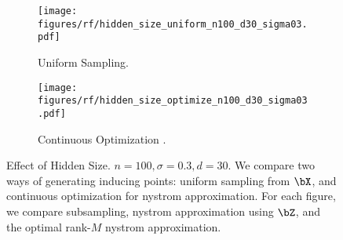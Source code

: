 \begin{figure}[h]
\centering
\begin{subfigure}[b]{\textwidth}
       \texttt{[image: figures/rf/hidden\_size\_uniform\_n100\_d30\_sigma03.pdf]}
       \caption{Uniform Sampling.}
      \end{subfigure}
      \hspace{2em}
\begin{subfigure}[b]{\textwidth}
       \texttt{[image: figures/rf/hidden\_size\_optimize\_n100\_d30\_sigma03.pdf]}
       \caption{Continuous Optimization .}
      \end{subfigure}
      \hspace{2em}
\caption{Effect of Hidden Size. $n=100, \sigma=0.3, d=30$. We compare two ways of generating inducing points: uniform sampling from $\bX$, and continuous optimization for nystrom approximation. For each figure, we compare subsampling, nystrom approximation using $\bZ$, and the optimal rank-$M$ nystrom approximation.  }
\end{figure}

%
%
%
%


